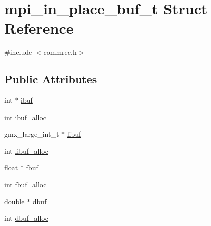 \hypertarget{structmpi__in__place__buf__t}{\section{mpi\-\_\-in\-\_\-place\-\_\-buf\-\_\-t \-Struct \-Reference}
\label{structmpi__in__place__buf__t}
}


{\ttfamily \#include $<$commrec.\-h$>$}

\subsection*{\-Public \-Attributes}
\begin{DoxyCompactItemize}
\item 
int $\ast$ \hyperlink{structmpi__in__place__buf__t_af58e25f67884dc799ce91cf2cd153a99}{ibuf}
\item 
int \hyperlink{structmpi__in__place__buf__t_a9b4962ca65818eee97e3ca3473b0805c}{ibuf\-\_\-alloc}
\item 
gmx\-\_\-large\-\_\-int\-\_\-t $\ast$ \hyperlink{structmpi__in__place__buf__t_a04034fcc007503b1952c7f4f897e83cc}{libuf}
\item 
int \hyperlink{structmpi__in__place__buf__t_aa171d24a7243f97a891cb12324ead377}{libuf\-\_\-alloc}
\item 
float $\ast$ \hyperlink{structmpi__in__place__buf__t_a373d341830dd3836682f61ea8ab14a7a}{fbuf}
\item 
int \hyperlink{structmpi__in__place__buf__t_a70ff4cd3e412052aa8bdca5d9a8dc7fd}{fbuf\-\_\-alloc}
\item 
double $\ast$ \hyperlink{structmpi__in__place__buf__t_a8bb005fe1bfc1cf8eebc730e81599c9e}{dbuf}
\item 
int \hyperlink{structmpi__in__place__buf__t_adc0af681402f6a3f7469c424f26ac1ae}{dbuf\-\_\-alloc}
\end{DoxyCompactItemize}



